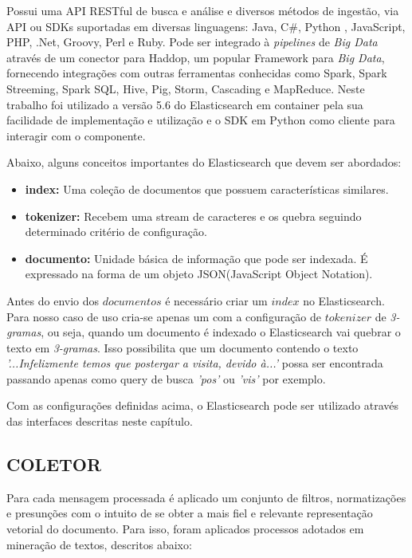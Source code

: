 \documentclass[12pt,a4paper]{article}
\begin{document}
Possui uma API RESTful de busca e análise e diversos métodos de ingestão, via API ou SDKs suportadas em diversas linguagens:
 Java, C\#, Python , JavaScript, PHP, .Net, Groovy, Perl e Ruby. Pode ser integrado à \textit{pipelines} de \textit{Big Data} através
 de um conector para Haddop, um popular Framework para \textit{Big Data}, fornecendo integrações com outras ferramentas conhecidas como Spark, Spark Streeming, Spark SQL,
 Hive, Pig, Storm, Cascading e MapReduce. Neste trabalho foi utilizado a versão 5.6 do Elasticsearch em container pela sua facilidade de implementação e utilização e o SDK em Python como cliente para interagir com o componente. 

Abaixo, alguns conceitos importantes do Elasticsearch que devem ser abordados:

 \begin{itemize}
   \item \textbf{index:} Uma coleção de documentos que possuem características similares.
   \item \textbf{tokenizer:} Recebem uma stream de caracteres e os quebra seguindo determinado critério de configuração.
   \item \textbf{documento:} Unidade básica de informação que pode ser indexada. É expressado na forma de um objeto JSON(JavaScript Object Notation).
 \end{itemize}

Antes do envio dos $documentos$ é necessário criar um $index$ no Elasticsearch. Para nosso caso de uso cria-se apenas um com a configuração
de $tokenizer$ de \textit{3-gramas}, ou seja, quando um documento é indexado o Elasticsearch vai quebrar o texto em \textit{3-gramas}. Isso
possibilita que um documento contendo o texto \textit{'...Infelizmente temos que postergar a visita, devido à...'} possa ser encontrada passando
apenas como query de busca \textit{'pos'} ou \textit{'vis'} por exemplo.

Com as configurações definidas acima, o Elasticsearch pode ser utilizado através das interfaces descritas neste capítulo.


\subsection{COLETOR} \label{sec:coletor}
Para cada mensagem processada é aplicado um conjunto de filtros, normatizações e presunções com o intuito de se obter a mais fiel e relevante representação vetorial do documento.
 Para isso, foram aplicados processos adotados em mineração de textos, descritos abaixo:
\end{document}
